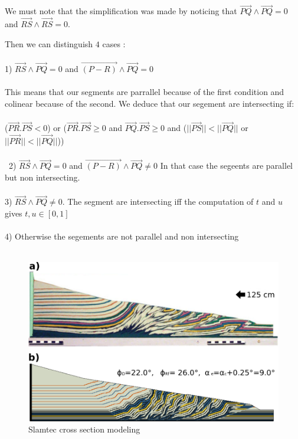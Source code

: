 \documentclass[12pt, a4paper]{memoir} %
\begin{document}
We must note that the simplification was made by noticing that $\overrightarrow{PQ} \wedge \overrightarrow{PQ} = 0$ and $\overrightarrow{RS} \wedge \overrightarrow{RS} = 0$.

Then we can distinguish $4$ cases :\\\\
1) $ \overrightarrow{RS} \wedge \overrightarrow{PQ} = 0$ and $\overrightarrow{(P - R)} \wedge \overrightarrow{PQ} = 0$\\\\
This means that our segments are parrallel because of the first condition and colinear because of the second. We deduce that our segement are intersecting if: \\\\ 
($\overrightarrow{PR}.\overrightarrow{PS} < 0$) or ($\overrightarrow{PR}.\overrightarrow{PS} \geq 0$ and $\overrightarrow{PQ}.\overrightarrow{PS} \geq 0$ and ($||\overrightarrow{PS}|| < ||\overrightarrow{PQ}||$ or $||\overrightarrow{PR}|| < ||\overrightarrow{PQ}||$))
\\\\\
2)  $ \overrightarrow{RS} \wedge \overrightarrow{PQ} = 0$ and $\overrightarrow{(P - R)} \wedge \overrightarrow{PQ} \neq 0$
In that case the segeents are parallel but non intersecting.\\\\
3)  $ \overrightarrow{RS} \wedge \overrightarrow{PQ} \neq 0$.
The segment are intersecting iff the computation of $t$ and $u$ gives $t,u \in [0,1]$\\\\
4) Otherwise the segements are not parallel and non intersecting\\\\
\begin{figure}[H]
	\centering
	\includegraphics[scale=0.5]{slamtec.png}
	\caption{Slamtec cross section modeling}
\end{figure}




\end{document}
